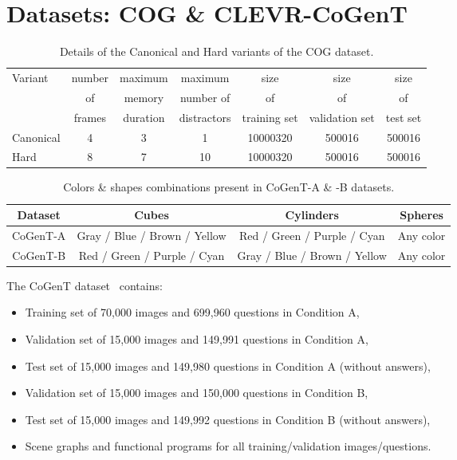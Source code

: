 \section{Datasets: COG \& CLEVR-CoGenT}
\label{sec:datasets-desc}

\begin{table}[ht]
	\centering
	\begin{tabular}{lcccccc}
		\toprule
		Variant    &  	number &  	maximum & maximum & size & size & size  \\ 
		& of   & memory & number of & of & of & of  \\
		& frames & duration & distractors & training set & validation set & test set \\
		\midrule
		Canonical & 4 & 3 & 1 & 10000320 & 500016 & 500016 \\	
		Hard  & 8 & 7 & 10 & 10000320 & 500016  & 500016 \\
		\bottomrule	
	\end{tabular}
	\caption{Details of the Canonical and Hard variants of the COG dataset.}
	\label{tab:cog_variants_supplement}
\end{table}

\begin{table}[ht]
	\centering
	\begin{tabular}{cccc}
		\toprule
		Dataset	&	Cubes	&	Cylinders	&	Spheres	\\
		\midrule
		CoGenT-A	&	Gray / Blue / Brown / Yellow	&	Red / Green / Purple / Cyan	&	Any color	\\
		CoGenT-B	&	Red / Green / Purple / Cyan	&	Gray / Blue / Brown / Yellow	&	Any color 	\\
		\bottomrule
	\end{tabular}
	\caption{Colors \& shapes combinations present in CoGenT-A \& -B datasets.}
    \label{tab:cogent_conditions_supplement}
\end{table}

The CoGenT dataset~\cite{johnson2017clevr} contains:
\begin{itemize}
	\def\labelitemi{--}
	\item Training set of 70,000 images and 699,960 questions in Condition A,
	\item Validation set of 15,000 images and 149,991 questions in Condition A,
	\item Test set of 15,000 images and 149,980 questions in Condition A (without answers),
	\item Validation set of 15,000 images and 150,000 questions in Condition B,
	\item Test set of 15,000 images and 149,992 questions in Condition B (without answers),
	\item Scene graphs and functional programs for all training/validation images/questions.
\end{itemize}


